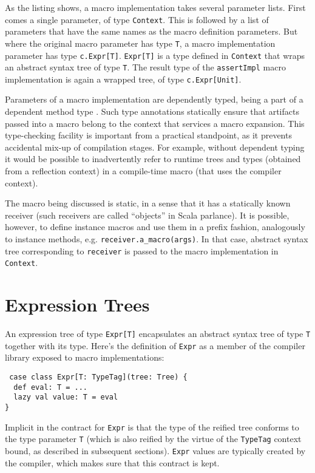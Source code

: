 \documentclass{llncs}
\begin{document}
As the listing shows, a macro implementation takes several parameter lists. First comes a single parameter, of type \lstinline$Context$. This is followed by a list of parameters that have the same names as the macro definition parameters. But where the original macro parameter has type \lstinline$T$, a macro implementation parameter has type \lstinline$c.Expr[T]$. \lstinline$Expr[T]$ is a type defined in \lstinline$Context$ that wraps an abstract syntax tree of type \lstinline$T$. The result type of the \lstinline$assertImpl$ macro implementation is again a wrapped tree, of type \lstinline$c.Expr[Unit]$.

Parameters of a macro implementation are dependently typed, being a part of a dependent method type \cite{odersky03}. Such type annotations statically ensure that artifacts passed into a macro belong to the context that services a macro expansion. This type-checking facility is important from a practical standpoint, as it prevents accidental mix-up of compilation stages. For example, without dependent typing it would be possible to inadvertently refer to runtime trees and types (obtained from a reflection context) in a compile-time macro (that uses the compiler context).

The macro being discussed is static, in a sense that it has a statically known receiver (such receivers are called ``objects'' in Scala parlance). It is possible, however, to define instance macros and use them in a prefix fashion, analogously to instance methods, e.g. \lstinline$receiver.a_macro(args)$. In that case, abstract syntax tree corresponding to \lstinline$receiver$ is passed to the macro implementation in \lstinline$Context$.

\section{Expression Trees}

An expression tree of type \lstinline$Expr[T]$ encapsulates an abstract syntax tree of type \lstinline$T$ together with its type. Here’s the definition of \lstinline$Expr$ as a member of the compiler library exposed to macro implementations:

\begin{lstlisting}
 case class Expr[T: TypeTag](tree: Tree) {
  def eval: T = ...
  lazy val value: T = eval
}
\end{lstlisting}

Implicit in the contract for \lstinline$Expr$ is that the type of the reified tree conforms to the type parameter \lstinline$T$ (which is also reified by the virtue of the \lstinline$TypeTag$ context bound, as described in subsequent sections). \lstinline$Expr$ values are typically created by the compiler, which makes sure that this contract is kept.
\end{document}
